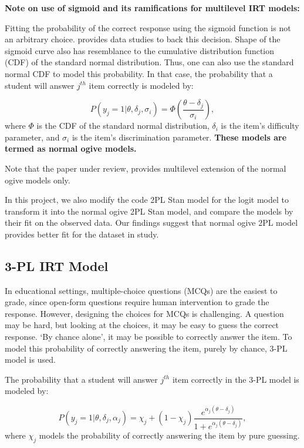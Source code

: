 \documentclass[12pt]{article}
\begin{document}
\textbf{Note on use of sigmoid and its ramifications for multilevel IRT models:}

Fitting the probability of the correct response using the sigmoid function is not an arbitrary choice. \cite{de2013theory} provides data studies to back this decision. Shape of the sigmoid curve also has resemblance to the cumulative distribution function (CDF) of the standard normal distribution. Thus, one can also use the standard normal CDF to model this probability. In that case, the probability that a student will answer $j^{th}$ item correctly is modeled by:

\begin{equation}\label{eq:2pl_normal_ogive}
    P(y_j=1|\theta, \delta_j, \sigma_i) = \Phi(\frac{\theta - \delta_j}{\sigma_i}),
\end{equation}
where $\Phi$ is the CDF of the standard normal distribution, $\delta_i$ is the item's difficulty parameter, and $\sigma_i$ is the item's discrimination parameter. \textbf{These models are termed as normal ogive models.}

Note that the paper under review, \cite{fox2001bayesian} provides multilevel extension of the normal ogive models only.

In this project, we also modify the code 2PL Stan model for the logit model to transform it into the normal ogive 2PL Stan model, and compare the models by their fit on the observed data. Our findings suggest that normal ogive 2PL model provides better fit for the dataset in study.

\subsection{3-PL IRT Model}
In educational settings, multiple-choice questions (MCQs) are the easiest to grade, since open-form questions require human intervention to grade the response. However, designing the choices for MCQs is challenging. A question may be hard, but looking at the choices, it may be easy to guess the correct response. `By chance alone', it may be possible to correctly answer the item. To model this probability of correctly answering the item, purely by chance, 3-PL model is used.

The probability that a student will answer $j^{th}$ item correctly in the 3-PL model is modeled by:

\begin{equation}\label{eq:3pl}
    P(y_j=1|\theta, \delta_j, \alpha_j) = \chi_j + (1 - \chi_j) \frac{e^{\alpha_j(\theta - \delta_j)}}{1+e^{\alpha_j(\theta - \delta_j)}},
\end{equation}
where $\chi_j$ models the probability of correctly answering the item by pure guessing.
\end{document}
